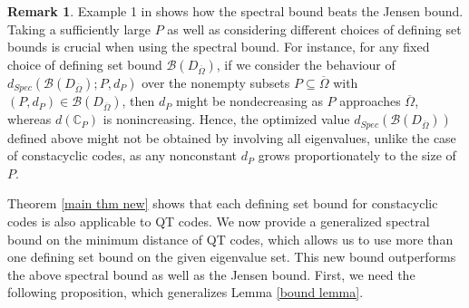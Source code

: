 \documentclass[11pt]{amsart}
\theoremstyle{plain}
\theoremstyle{definition}
\newtheorem{rem}[thm]{Remark}
\numberwithin{equation}{section}
\begin{document}
\begin{rem}
Example 1 in \cite{ELLOT} shows how the spectral bound beats the Jensen bound. Taking a sufficiently large $P$ as well as considering different choices of defining set bounds is crucial when using the spectral bound. For instance, for any fixed choice of defining set bound $\mathcal{B}(D_{\overline{\Omega}})$, if we consider the behaviour of $d_{Spec}(\mathcal{B}(D_{\overline{\Omega}}) ; P, d_P)$ over the nonempty subsets $P\subseteq \overline{\Omega}$ with $(P,d_P)\in\mathcal{B}(D_{\overline{\Omega}})$, then $d_P$ might be nondecreasing as $P$ approaches $\overline{\Omega}$, whereas $d(\mathbb{C}_P)$ is nonincreasing. Hence, the optimized value $d_{Spec}(\mathcal{B}(D_{\overline{\Omega}}))$ defined above might not be obtained by involving all eigenvalues, unlike the case of constacyclic codes, as any nonconstant $d_P$ grows proportionately to the size of $P$. 
\end{rem}


Theorem \ref{main thm new} shows that each defining set bound for constacyclic codes is also applicable to QT codes. We now provide a generalized spectral bound on the minimum distance of QT codes, which allows us to use more than one defining set bound on the given eigenvalue set. This new bound outperforms the above spectral bound as well as the Jensen bound. First, we need the following proposition, which generalizes Lemma \ref{bound lemma}.
\end{document}
